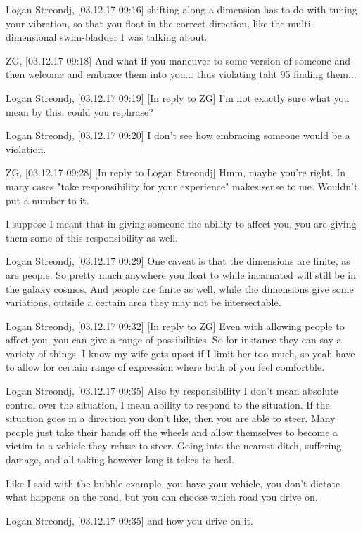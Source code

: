 Logan Streondj, [03.12.17 09:16]
shifting along a dimension has to do with tuning your vibration,
so that you float in the correct direction, like the multi-dimensional
swim-bladder I was talking about.

ZG, [03.12.17 09:18]
And what if you maneuver to some version of someone and then welcome and embrace
them into you... thus violating taht 95%
finding them...

Logan Streondj, [03.12.17 09:19]
[In reply to ZG]
I'm not exactly sure what you mean by this.
could you rephrase?

Logan Streondj, [03.12.17 09:20]
I don't see how embracing someone would be a violation.

ZG, [03.12.17 09:28]
[In reply to Logan Streondj]
Hmm, maybe you're right. In many cases "take responsibility for your experience"
makes sense to me. Wouldn't put a number to it.

I suppose I meant that in giving someone the ability to affect you, you are
giving them some of this responsibility as well.

Logan Streondj, [03.12.17 09:29]
One caveat is that the dimensions are finite, as are people.  So pretty much
anywhere you float to while incarnated will still be in the galaxy cosmos. And
people are finite as well, while the dimensions give some variations,  outside a
certain area they may not be intersectable.

Logan Streondj, [03.12.17 09:32]
[In reply to ZG]
Even with allowing people to affect you, you can give a range of possibilities.
So for instance they can say a variety of things.  
I know my wife gets upset if I limit her too much,  so yeah have to allow for
certain range of expression where both of you feel comfortble.

Logan Streondj, [03.12.17 09:35]
Also by responsibility I don't mean absolute control over the situation, I mean
ability to respond to the situation.
If the situation goes in  a direction you don't like, then you are able to
steer.
Many people just take their hands off the wheels and allow themselves to become
a victim to a vehicle they refuse to steer.
Going into the nearest ditch, suffering damage, and all taking however long it
takes to heal.

Like I said with the bubble example, you have your vehicle,  you don't dictate
what happens on the road, but you can choose which road you drive on.

Logan Streondj, [03.12.17 09:35]
and how you drive on it.

